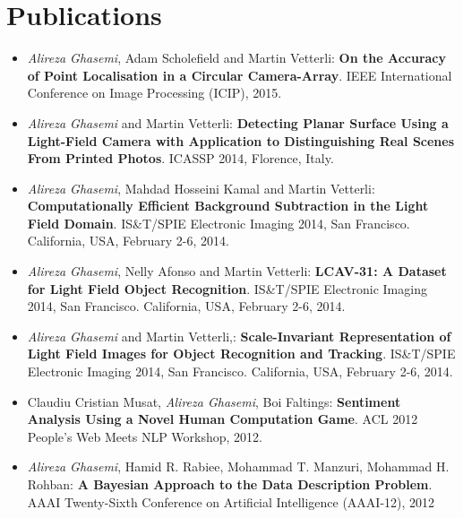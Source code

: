 \documentclass[11pt,a4paper,sans]{moderncv}        %
\begin{document}
\section{Publications}
{
\begin{itemize}
\item \textit{Alireza Ghasemi}, Adam Scholefield and Martin Vetterli:\textbf{ On the Accuracy of Point Localisation in a Circular Camera-Array}. IEEE International Conference on Image Processing (ICIP), 2015.


\item \textit{Alireza Ghasemi} and Martin Vetterli:\textbf{ Detecting Planar Surface Using a Light-Field Camera with Application
to Distinguishing Real Scenes From Printed Photos}.  ICASSP 2014, Florence, Italy.

\item \textit{Alireza Ghasemi}, Mahdad Hosseini Kamal  and Martin Vetterli: \textbf{Computationally Efficient Background Subtraction in the Light Field Domain}.  IS\&T/SPIE Electronic Imaging 2014, San Francisco. California, USA, February 2-6, 2014.

\item \textit{Alireza Ghasemi}, Nelly Afonso  and Martin Vetterli: \textbf{LCAV-31: A Dataset for Light Field Object Recognition}.  IS\&T/SPIE Electronic Imaging 2014, San Francisco. California, USA, February 2-6, 2014.

\item \textit{Alireza Ghasemi} and Martin Vetterli,: \textbf{Scale-Invariant Representation of Light Field Images for Object Recognition and Tracking}.  IS\&T/SPIE Electronic Imaging 2014, San Francisco. California, USA, February 2-6, 2014.



\item Claudiu Cristian Musat, \textit{Alireza Ghasemi}, Boi Faltings: \textbf{Sentiment Analysis Using a Novel Human Computation Game}.  ACL 2012 People's Web Meets NLP Workshop, 2012.

\item \textit{Alireza Ghasemi}, Hamid R. Rabiee,  Mohammad T. Manzuri, Mohammad H. Rohban:\textbf{ A Bayesian Approach to the Data Description Problem}.  AAAI Twenty-Sixth Conference on Artificial Intelligence (AAAI-12), 2012


\end{itemize}}
\end{document}
